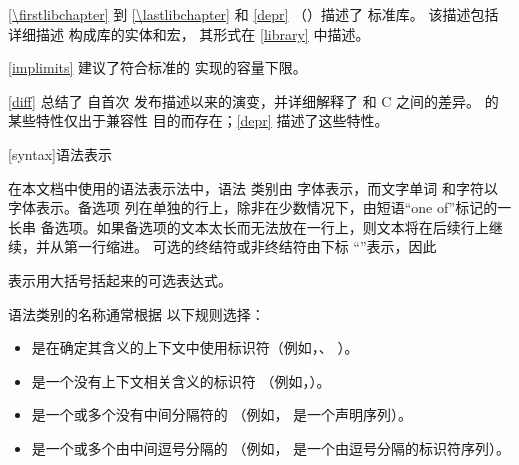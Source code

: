 \pnum
\ref{\firstlibchapter} 到 \ref{\lastlibchapter} 和 \ref{depr}
（）描述了 \Cpp{} 标准库。
该描述包括详细描述
构成库的实体和宏，
其形式在 \ref{library} 中描述。

\pnum
\ref{implimits} 建议了符合标准的
实现的容量下限。

\pnum
\ref{diff} 总结了 \Cpp{} 自首次
发布描述以来的演变，并详细解释了
\Cpp{} 和 C 之间的差异。 \Cpp{} 的某些特性仅出于兼容性
目的而存在；\ref{depr} 描述了这些特性。

[syntax]{语法表示}

\pnum
{}%
在本文档中使用的语法表示法中，语法
类别由  字体表示，而文字单词
和字符以  字体表示。备选项
列在单独的行上，除非在少数情况下，由短语“one of”标记的一长串
备选项。如果备选项的文本太长而无法放在一行上，则文本将在后续行上继续，并从第一行缩进。
可选的终结符或非终结符由下标
“\opt{\relax}”表示，因此
\begin{ncbnf}
\terminal{\{}  \terminal{\}}
\end{ncbnf}
表示用大括号括起来的可选表达式。%

\pnum
语法类别的名称通常根据
以下规则选择：
\begin{itemize}
\item {} 是在确定其含义的上下文中使用标识符（例如，、
）。
\item {} 是一个没有上下文相关含义的标识符
（例如，）。
\item {} 是一个或多个没有中间分隔符的 （例如， 是一个声明序列）。
\item {} 是一个或多个由中间逗号分隔的 （例如， 是一个由逗号分隔的标识符序列）。
\end{itemize}%
